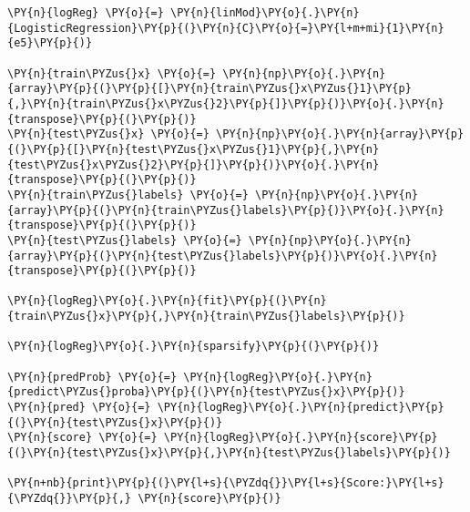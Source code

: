 {\par%
\vspace{-1\baselineskip}%
}%
\begin{notebookcell}[]%
\begin{addmargin}[\cellleftmargin]{0em}%
{\smaller%
\par%
%
\vspace{-1\smallerfontscale}%
\begin{Verbatim}[commandchars=\\\{\}]
\PY{n}{logReg} \PY{o}{=} \PY{n}{linMod}\PY{o}{.}\PY{n}{LogisticRegression}\PY{p}{(}\PY{n}{C}\PY{o}{=}\PY{l+m+mi}{1}\PY{n}{e5}\PY{p}{)}

\PY{n}{train\PYZus{}x} \PY{o}{=} \PY{n}{np}\PY{o}{.}\PY{n}{array}\PY{p}{(}\PY{p}{[}\PY{n}{train\PYZus{}x\PYZus{}1}\PY{p}{,}\PY{n}{train\PYZus{}x\PYZus{}2}\PY{p}{]}\PY{p}{)}\PY{o}{.}\PY{n}{transpose}\PY{p}{(}\PY{p}{)}
\PY{n}{test\PYZus{}x} \PY{o}{=} \PY{n}{np}\PY{o}{.}\PY{n}{array}\PY{p}{(}\PY{p}{[}\PY{n}{test\PYZus{}x\PYZus{}1}\PY{p}{,}\PY{n}{test\PYZus{}x\PYZus{}2}\PY{p}{]}\PY{p}{)}\PY{o}{.}\PY{n}{transpose}\PY{p}{(}\PY{p}{)}
\PY{n}{train\PYZus{}labels} \PY{o}{=} \PY{n}{np}\PY{o}{.}\PY{n}{array}\PY{p}{(}\PY{n}{train\PYZus{}labels}\PY{p}{)}\PY{o}{.}\PY{n}{transpose}\PY{p}{(}\PY{p}{)}
\PY{n}{test\PYZus{}labels} \PY{o}{=} \PY{n}{np}\PY{o}{.}\PY{n}{array}\PY{p}{(}\PY{n}{test\PYZus{}labels}\PY{p}{)}\PY{o}{.}\PY{n}{transpose}\PY{p}{(}\PY{p}{)}

\PY{n}{logReg}\PY{o}{.}\PY{n}{fit}\PY{p}{(}\PY{n}{train\PYZus{}x}\PY{p}{,}\PY{n}{train\PYZus{}labels}\PY{p}{)}

\PY{n}{logReg}\PY{o}{.}\PY{n}{sparsify}\PY{p}{(}\PY{p}{)}

\PY{n}{predProb} \PY{o}{=} \PY{n}{logReg}\PY{o}{.}\PY{n}{predict\PYZus{}proba}\PY{p}{(}\PY{n}{test\PYZus{}x}\PY{p}{)}
\PY{n}{pred} \PY{o}{=} \PY{n}{logReg}\PY{o}{.}\PY{n}{predict}\PY{p}{(}\PY{n}{test\PYZus{}x}\PY{p}{)}
\PY{n}{score} \PY{o}{=} \PY{n}{logReg}\PY{o}{.}\PY{n}{score}\PY{p}{(}\PY{n}{test\PYZus{}x}\PY{p}{,}\PY{n}{test\PYZus{}labels}\PY{p}{)}

\PY{n+nb}{print}\PY{p}{(}\PY{l+s}{\PYZdq{}}\PY{l+s}{Score:}\PY{l+s}{\PYZdq{}}\PY{p}{,} \PY{n}{score}\PY{p}{)}
\end{Verbatim}
%
\par%
\vspace{-1\smallerfontscale}}%
\end{addmargin}
\end{notebookcell}


